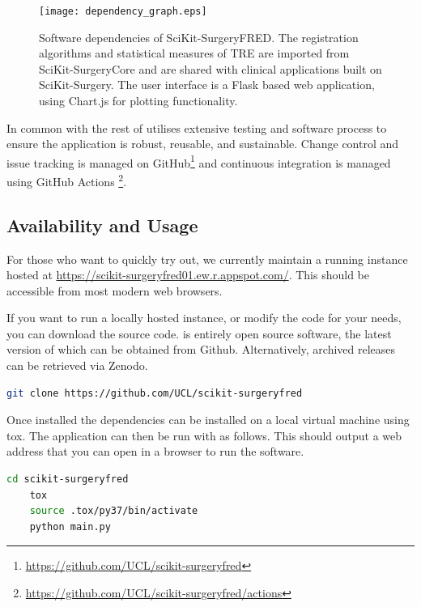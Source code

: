 \begin{figure}
	\begin{center}
	\texttt{[image: dependency\_graph.eps]}
		\caption{\label{fig:dependencies}Software dependencies of SciKit-SurgeryFRED. The registration algorithms and statistical measures of {TRE} are imported from SciKit-SurgeryCore and are shared with clinical applications built on SciKit-Surgery. The user interface is a Flask based web application, using Chart.js for plotting functionality.}
	\end{center}
\end{figure}

In common with the rest of \sksurgery \fred utilises extensive testing and software process \cite{1398621} to 
ensure the application is robust, reusable, and sustainable\cite{VENTERS2018174}. Change control and issue tracking is managed
on GitHub\footnote{\href{https://github.com/UCL/scikit-surgeryfred}{https://github.com/UCL/scikit-surgeryfred}} and continuous integration is managed using
GitHub Actions \footnote{\href{https://github.com/UCL/scikit-surgeryfred/actions}{https://github.com/UCL/scikit-surgeryfred/actions}}.

\subsection{Availability and Usage}
For those who want to quickly try \fred out, we currently maintain a running instance hosted at \href{https://scikit-surgeryfred01.ew.r.appspot.com/}{https://scikit-surgeryfred01.ew.r.appspot.com/}. This should be accessible from most modern web browsers.

If you want to run a locally hosted instance, or modify the code for your needs, you can download the source code. \fred is entirely open source software, the latest version of which can be obtained from Github. Alternatively, archived releases can be retrieved via Zenodo\cite{stephen_thompson_2020_4314971}.

\begin{lstlisting}[language=bash]
	git clone https://github.com/UCL/scikit-surgeryfred
\end{lstlisting}

Once installed the dependencies can be installed on a local virtual machine using tox. The application can then be run with as follows. This should output a web address that you can open in a browser to run the software. 

\begin{lstlisting}[language=bash]
	cd scikit-surgeryfred
	tox
	source .tox/py37/bin/activate
	python main.py
\end{lstlisting}

